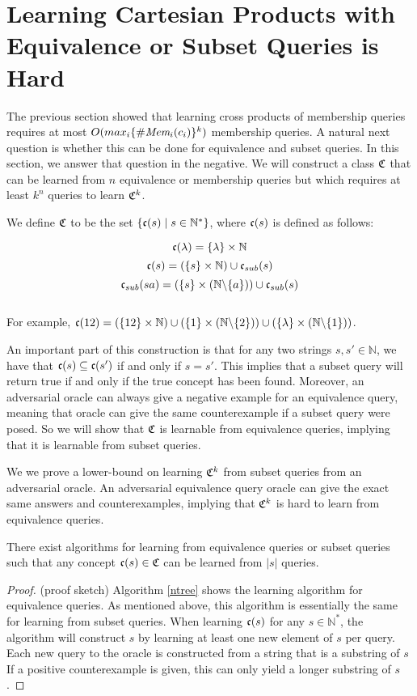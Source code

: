 \section{Learning Cartesian Products with Equivalence or Subset Queries is Hard}


The previous section showed that learning cross products of membership queries requires at most $O(max_i \{ \#\emph{Mem}_{i}(c_i) \}^k)$ membership queries. 
A natural next question is whether this can be done for equivalence and subset queries. 
In this section, we answer that question in the negative. 
We will construct a class $\mathfrak{C}$ that can be learned from $n$ equivalence or membership queries but which requires at least $k^n$ queries to learn $\mathfrak{C}^k$.  

We define $\mathfrak{C}$ to be the set $\{ \mathfrak{c}(s) \mid s \in \mathbb{N}^* \}$, where $\mathfrak{c}(s)$ is defined as follows:

\[\mathfrak{c}(\lambda) = \{\lambda\} \times \mathbb{N}\]
\[\mathfrak{c}(s) = (\{s\} \times \mathbb{N}) \cup \mathfrak{c}_{sub}(s)\]
\[\mathfrak{c}_{sub}(sa) = (\{s\} \times (\mathbb{N} \backslash \{a\})) \cup \mathfrak{c}_{sub}(s)\]\\

For example, $\mathfrak{c}(12) = (\{12\} \times \mathbb{N}) \cup (\{1\}\times(\mathbb{N} \backslash \{2\}))\cup(\{\lambda\} \times (\mathbb{N} \backslash \{1\}))$.


An important part of this construction is that for any two strings $s,s' \in \mathbb{N}$, we have that $\mathfrak{c}(s) \subseteq \mathfrak{c}(s')$ if and only if $s = s'$. 
This implies that a subset query will return true if and only if the true concept has been found. 
Moreover, an adversarial oracle can always give a negative example for an equivalence query, meaning that oracle can give the same counterexample if a subset query were posed. 
So we will show that $\mathfrak{C}$ is learnable from equivalence queries, implying that it is learnable from subset queries. 

We we prove a lower-bound on learning $\mathfrak{C}^k$ from subset queries from an adversarial oracle. 
An adversarial equivalence query oracle can give the exact same answers and counterexamples, implying that  $\mathfrak{C}^k$ is hard to learn from equivalence queries. 

\begin{proposition}
There exist algorithms for learning from equivalence queries or subset queries such that any concept $\mathfrak{c}(s) \in \mathfrak{C}$ can be learned from $|s|$ queries. 
\end{proposition}
\begin{proof}
(proof sketch) Algorithm \ref{ntree} shows the learning algorithm for equivalence queries. 
As mentioned above, this algorithm is essentially the same for learning from subset queries. 
When learning $\mathfrak{c}(s)$ for any $s \in \mathbb{N}^*$, the algorithm will construct $s$ by learning at least one new element of $s$ per query. 
Each new query to the oracle is constructed from a string that is a substring of $s$
If a positive counterexample is given, this can only yield a longer substring of $s$.
\end{proof}



